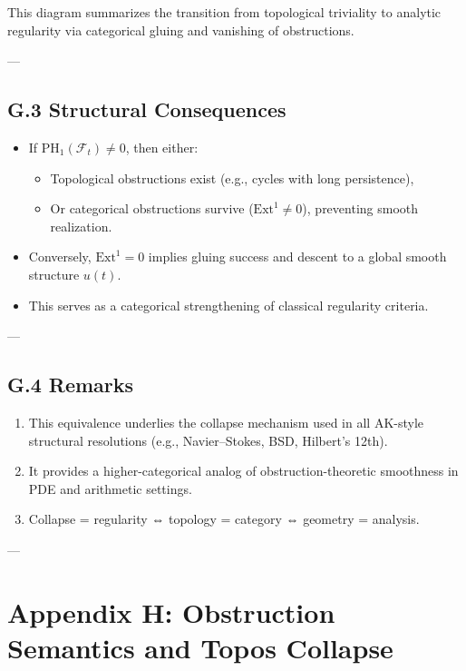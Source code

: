 \documentclass[11pt]{article}
\begin{document}
This diagram summarizes the transition from topological triviality to analytic regularity via categorical gluing and vanishing of obstructions.

---

\subsection*{G.3 Structural Consequences}

\begin{itemize}
  \item If $\mathrm{PH}_1(\mathcal{F}_t) \neq 0$, then either:
    \begin{itemize}
      \item Topological obstructions exist (e.g., cycles with long persistence),
      \item Or categorical obstructions survive ($\mathrm{Ext}^1 \neq 0$), preventing smooth realization.
    \end{itemize}
  \item Conversely, $\mathrm{Ext}^1 = 0$ implies gluing success and descent to a global smooth structure $u(t)$.
  \item This serves as a categorical strengthening of classical regularity criteria.
\end{itemize}

---

\subsection*{G.4 Remarks}

\begin{enumerate}
  \item This equivalence underlies the collapse mechanism used in all AK-style structural resolutions (e.g., Navier–Stokes, BSD, Hilbert's 12th).
  \item It provides a higher-categorical analog of obstruction-theoretic smoothness in PDE and arithmetic settings.
  \item Collapse = regularity ⇔ topology = category ⇔ geometry = analysis.
\end{enumerate}


---



\section*{Appendix H: Obstruction Semantics and Topos Collapse}
\end{document}
